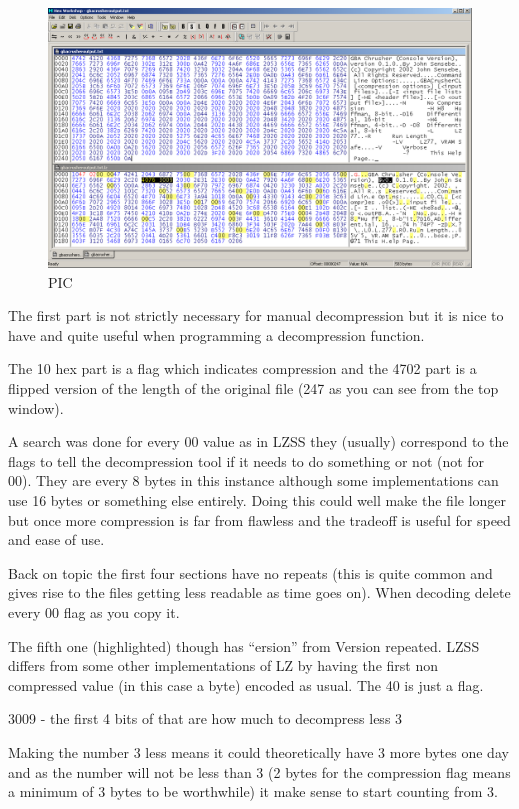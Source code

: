 \documentclass[
]{book}
\begin{document}
\begin{figure}
\centering
\includegraphics{images/191_home_fast6191_romhackingguide_unrenamed_fil___omhackingguidecompressionsLZworkedexample_1.png}
\caption{PIC}
\end{figure}

The first part is not strictly necessary for manual decompression but it is nice to have and quite useful when programming a decompression function.

The 10 hex part is a flag which indicates compression and the 4702 part is a flipped version of the length of the original file (247 as you can see from the top window).

A search was done for every 00 value as in LZSS they (usually) correspond to the flags to tell the decompression tool if it needs to do something or not (not for 00). They are every 8 bytes in this instance although some implementations can use 16 bytes or something else entirely. Doing this could well make the file longer but once more compression is far from flawless and the tradeoff is useful for speed and ease of use.

Back on topic the first four sections have no repeats (this is quite common and gives rise to the files getting less readable as time goes on). When decoding delete every 00 flag as you copy it.

The fifth one (highlighted) though has ``ersion'' from Version repeated. LZSS differs from some other implementations of LZ by having the first non compressed value (in this case a byte) encoded as usual. The 40 is just a flag.

3009 - the first 4 bits of that are how much to decompress less 3

Making the number 3 less means it could theoretically have 3 more bytes one day and as the number will not be less than 3 (2 bytes for the compression flag means a minimum of 3 bytes to be worthwhile) it make sense to start counting from 3.
\end{document}
